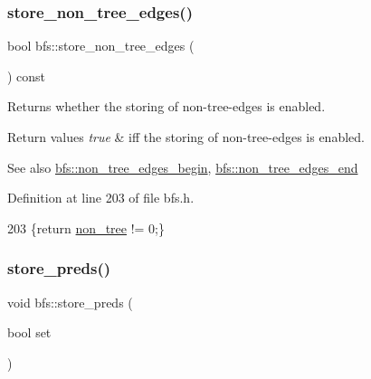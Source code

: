 \subsubsection{\texorpdfstring{store\+\_\+non\+\_\+tree\+\_\+edges()}{store\_non\_tree\_edges()}\hspace{0.1cm}{\footnotesize\ttfamily [2/2]}}
{\footnotesize\ttfamily bool bfs\+::store\+\_\+non\+\_\+tree\+\_\+edges (\begin{DoxyParamCaption}{ }\end{DoxyParamCaption}) const\hspace{0.3cm}{\ttfamily [inline]}}



Returns whether the storing of non-\/tree-\/edges is enabled. 


\begin{DoxyRetVals}{Return values}
{\em true} & iff the storing of non-\/tree-\/edges is enabled. \\
\hline
\end{DoxyRetVals}
\begin{DoxySeeAlso}{See also}
\mbox{\hyperlink{classbfs_a06d02d2643f184b4c086678771f0ff90}{bfs\+::non\+\_\+tree\+\_\+edges\+\_\+begin}}, \mbox{\hyperlink{classbfs_a9fb470cd36eb487004ca28c1723cabda}{bfs\+::non\+\_\+tree\+\_\+edges\+\_\+end}} 
\end{DoxySeeAlso}


Definition at line 203 of file bfs.\+h.


\begin{DoxyCode}
203 \{\textcolor{keywordflow}{return} \mbox{\hyperlink{classbfs_a056b2131db11e62eb8f41c8dcc117d2e}{non\_tree}} != 0;\}
\end{DoxyCode}
\mbox{\label{classbfs_a8c7ce0ea2cd8e1932d1da5693d90cf61}} 
\subsubsection{\texorpdfstring{store\+\_\+preds()}{store\_preds()}\hspace{0.1cm}{\footnotesize\ttfamily [1/2]}}
{\footnotesize\ttfamily void bfs\+::store\+\_\+preds (\begin{DoxyParamCaption}\item[{bool}]{set }\end{DoxyParamCaption})}



